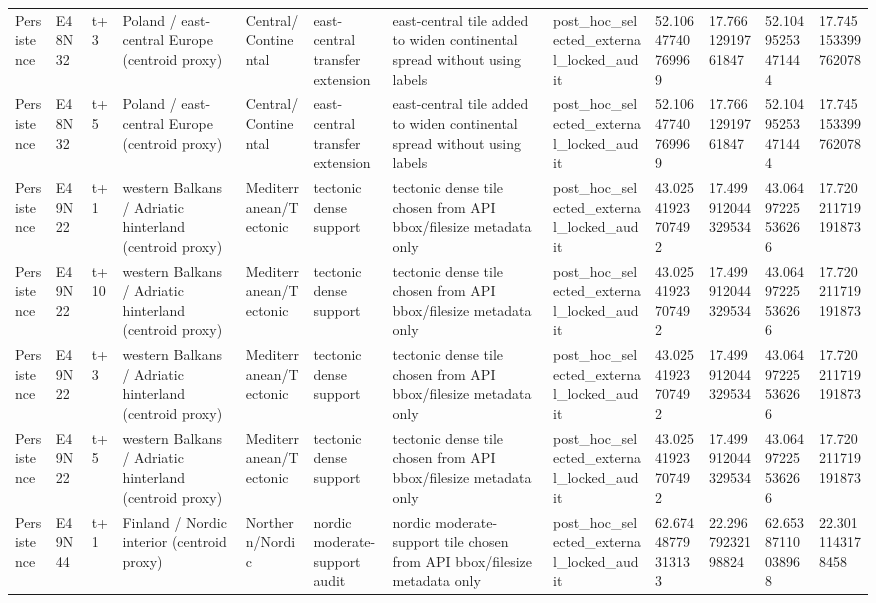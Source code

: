 \begin{landscape}
\begin{longtable}{llllllllllll}
Persistence & E48N32 & t+3 & Poland / east-central Europe (centroid proxy) & Central/Continental & east-central transfer extension & east-central tile added to widen continental spread without using labels & post\_hoc\_selected\_external\_locked\_audit & 52.10647740769969 & 17.76612919761847 & 52.10495253471444 & 17.745153399762078 \\
Persistence & E48N32 & t+5 & Poland / east-central Europe (centroid proxy) & Central/Continental & east-central transfer extension & east-central tile added to widen continental spread without using labels & post\_hoc\_selected\_external\_locked\_audit & 52.10647740769969 & 17.76612919761847 & 52.10495253471444 & 17.745153399762078 \\
Persistence & E49N22 & t+1 & western Balkans / Adriatic hinterland (centroid proxy) & Mediterranean/Tectonic & tectonic dense support & tectonic dense tile chosen from API bbox/filesize metadata only & post\_hoc\_selected\_external\_locked\_audit & 43.02541923707492 & 17.499912044329534 & 43.06497225536266 & 17.720211719191873 \\
Persistence & E49N22 & t+10 & western Balkans / Adriatic hinterland (centroid proxy) & Mediterranean/Tectonic & tectonic dense support & tectonic dense tile chosen from API bbox/filesize metadata only & post\_hoc\_selected\_external\_locked\_audit & 43.02541923707492 & 17.499912044329534 & 43.06497225536266 & 17.720211719191873 \\
Persistence & E49N22 & t+3 & western Balkans / Adriatic hinterland (centroid proxy) & Mediterranean/Tectonic & tectonic dense support & tectonic dense tile chosen from API bbox/filesize metadata only & post\_hoc\_selected\_external\_locked\_audit & 43.02541923707492 & 17.499912044329534 & 43.06497225536266 & 17.720211719191873 \\
Persistence & E49N22 & t+5 & western Balkans / Adriatic hinterland (centroid proxy) & Mediterranean/Tectonic & tectonic dense support & tectonic dense tile chosen from API bbox/filesize metadata only & post\_hoc\_selected\_external\_locked\_audit & 43.02541923707492 & 17.499912044329534 & 43.06497225536266 & 17.720211719191873 \\
Persistence & E49N44 & t+1 & Finland / Nordic interior (centroid proxy) & Northern/Nordic & nordic moderate-support audit & nordic moderate-support tile chosen from API bbox/filesize metadata only & post\_hoc\_selected\_external\_locked\_audit & 62.67448779313133 & 22.29679232198824 & 62.65387110038968 & 22.3011143178458 \\

\end{longtable}
\end{landscape}
